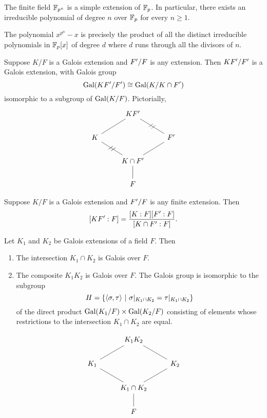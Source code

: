 \nl

\begin{prop}
The finite field $\mathbb{F}_{p^n}$ is a simple extension of $\mathbb{F}_p$. In particular, there exists an irreducible polynomial of degree $n$ over $\mathbb{F}_p$ for every $n\geq 1$.
\end{prop}

\nl

\begin{prop}
The polynomial $x^{p^n} - x$ is precisely the product of all the distinct irreducible polynomials in $\mathbb{F}_p[x]$ of degree $d$ where $d$ runs through all the divisors of $n$.
\end{prop}

\nl

\begin{prop}
Suppose $K/F$ is a Galois extension and $F^\prime/ F$ is any extension. Then $KF^\prime/F^\prime$ is a Galois extension, with Galois group
\[\text{Gal}(KF^\prime/F^\prime)\cong \text{Gal}(K/K\cap F^\prime)\]
isomorphic to a subgroup of $\text{Gal}(K/F)$. Pictorially,
\[
\begin{tikzcd}
 & KF^\p & \\
K\arrow[ur, dash] & & F^\p\arrow[ul, dash, "//"{anchor = center, sloped}]\\
 & K\cap F^\p\arrow[ur, dash]\arrow[ul, dash, "//"{anchor = center, sloped}] & \\
 & F\arrow[u, dash] &
\end{tikzcd}
\]
\end{prop}

\nl

\begin{cor}
Suppose $K/F$ is a Galois extension and $F^\prime/F$ is any finite extension. Then 
\[[KF^\prime:F] = \frac{[K:F][F^\prime:F]}{[K\cap F^\prime:F]}.\]
\end{cor}

\nl

\begin{prop}
Let $K_1$ and $K_2$ be Galois extensions of a field $F$. Then
\begin{enumerate}
\item The intersection $K_1\cap K_2$ is Galois over $F$.
\item The composite $K_1K_2$ is Galois over $F$. The Galois group is isomorphic to the subgroup
\[H = \{\langle \sigma, \tau\rangle\ |\ \sigma |_{K_1\cap K_2} = \tau|_{K_1\cap K_2}\}\]
of the direct product $\text{Gal}(K_1/ F)\times \text{Gal}(K_2 / F)$ consisting of elements whose restrictions to the intersection $K_1\cap K_2$ are equal.
\end{enumerate}
\[
\begin{tikzcd}
 & K_1K_2 & \\
K_1\arrow[ur, dash] & & K_2\arrow[ul, dash]\\
 & K_1\cap K_2\arrow[ur, dash]\arrow[ul, dash] & \\
 & F\arrow[u, dash] &
\end{tikzcd}
\]
\end{prop}

